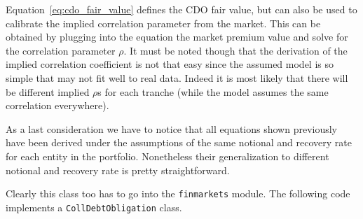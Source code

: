 Equation~\ref{eq:cdo_fair_value} defines the CDO fair value, but can also be used to calibrate the implied correlation parameter from the market. This can be obtained by plugging into the equation the market premium value and solve for the correlation parameter $\rho$. It must be noted though that the derivation of the implied correlation coefficient is not that easy since the assumed model is so simple that may not fit well to real data. Indeed it is most likely that there will be different implied $\rho$s for each tranche (while the model assumes the same correlation everywhere).

As a last consideration we have to notice that all equations shown previously have been derived under the assumptions of the same notional and recovery rate for each entity in the portfolio. Nonetheless their generalization to different notional and recovery rate is pretty straightforward.
 
%

\begin{finmarkets}
Clearly this class too has to go into the \texttt{finmarkets} module. The following code implements a \texttt{CollDebtObligation} class.
\end{finmarkets}


